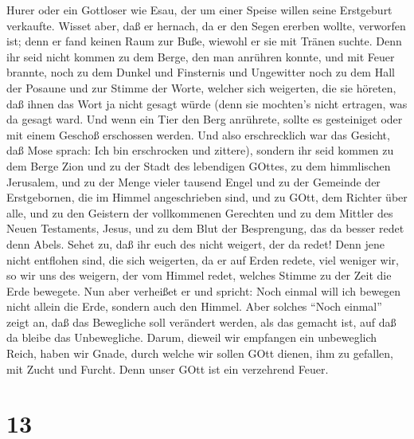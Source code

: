 Hurer oder ein Gottloser wie Esau, der um einer Speise willen seine
Erstgeburt verkaufte.  Wisset aber, daß er hernach, da er
den Segen ererben wollte, verworfen ist; denn er fand keinen Raum zur
Buße, wiewohl er sie mit Tränen suchte.  Denn ihr seid
nicht kommen zu dem Berge, den man anrühren konnte, und mit Feuer
brannte, noch zu dem Dunkel und Finsternis und Ungewitter 
noch zu dem Hall der Posaune und zur Stimme der Worte, welcher sich
weigerten, die sie höreten, daß ihnen das Wort ja nicht gesagt würde
 (denn sie mochten's nicht ertragen, was da gesagt ward.
Und wenn ein Tier den Berg anrührete, sollte es gesteiniget oder mit
einem Geschoß erschossen werden.  Und also erschrecklich
war das Gesicht, daß Mose sprach: Ich bin erschrocken und zittere),
 sondern ihr seid kommen zu dem Berge Zion und zu der Stadt
des lebendigen GOttes, zu dem himmlischen Jerusalem, und zu der Menge
vieler tausend Engel  und zu der Gemeinde der Erstgebornen,
die im Himmel angeschrieben sind, und zu GOtt, dem Richter über alle,
und zu den Geistern der vollkommenen Gerechten  und zu dem
Mittler des Neuen Testaments, Jesus, und zu dem Blut der Besprengung,
das da besser redet denn Abels.  Sehet zu, daß ihr euch des
nicht weigert, der da redet! Denn jene nicht entflohen sind, die sich
weigerten, da er auf Erden redete, viel weniger wir, so wir uns des
weigern, der vom Himmel redet,  welches Stimme zu der Zeit
die Erde bewegete. Nun aber verheißet er und spricht: Noch einmal will
ich bewegen nicht allein die Erde, sondern auch den Himmel.
 Aber solches ``Noch einmal'' zeigt an, daß das Bewegliche
soll verändert werden, als das gemacht ist, auf daß da bleibe das
Unbewegliche.  Darum, dieweil wir empfangen ein unbeweglich
Reich, haben wir Gnade, durch welche wir sollen GOtt dienen, ihm zu
gefallen, mit Zucht und Furcht.  Denn unser GOtt ist ein
verzehrend Feuer.

\hypertarget{section-11}{%
\section{13}\label{section-11}}


